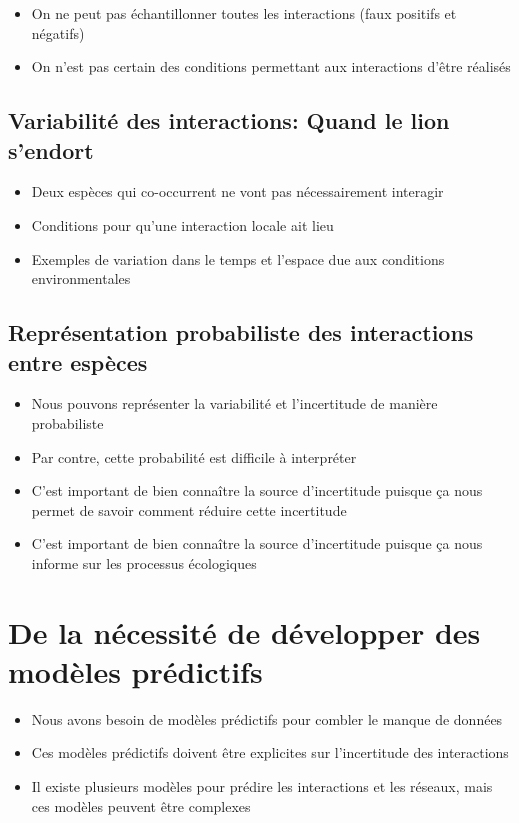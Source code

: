 \begin{itemize}
    \item On ne peut pas échantillonner toutes les interactions (faux positifs et négatifs)
    \item On n'est pas certain des conditions permettant aux interactions d'être réalisés
\end{itemize}

\subsection{Variabilité des interactions: Quand le lion s'endort} 

\begin{itemize}
    \item Deux espèces qui co-occurrent ne vont pas nécessairement interagir
    \item Conditions pour qu'une interaction locale ait lieu 
    \item Exemples de variation dans le temps et l'espace due aux conditions environmentales 
\end{itemize}

\subsection{Représentation probabiliste des interactions entre espèces} 

\begin{itemize}
    \item Nous pouvons représenter la variabilité et l'incertitude de manière probabiliste
    \item Par contre, cette probabilité est difficile à interpréter 
    \item C'est important de bien connaître la source d'incertitude puisque ça nous permet de savoir comment réduire cette incertitude
    \item C'est important de bien connaître la source d'incertitude puisque ça nous informe sur les processus écologiques 
\end{itemize}


\section{De la nécessité de développer des modèles prédictifs} 

\begin{itemize}
    \item Nous avons besoin de modèles prédictifs pour combler le manque de données 
    \item Ces modèles prédictifs doivent être explicites sur l'incertitude des interactions
    \item Il existe plusieurs modèles pour prédire les interactions et les réseaux, mais ces modèles peuvent être complexes
\end{itemize}

